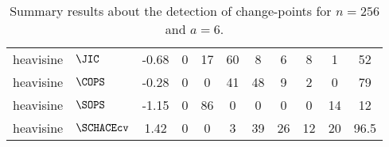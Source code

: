\begin{table}[ht]
\begin{tabular}{llccccccccc}
  heavisine & $\JIC$ & -0.68 &     0 &    17 &    60 &     8 &     6 &     8 &     1 &    52 \\ 
  heavisine & $\COPS$ & -0.28 &     0 &     0 &    41 &    48 &     9 &     2 &     0 &    79 \\ 
  heavisine & $\SOPS$ & -1.15 &     0 &    86 &     0 &     0 &     0 &     0 &    14 &    12 \\ 
  heavisine & $\SCHACEcv$ &  1.42 &     0 &     0 &     3 &    39 &    26 &    12 &    20 &  96.5 \\ 
  \end{tabular}
\caption{Summary results about the detection of change-points for $n = 256$ and $a = 6$.} 
\label{tab:CPn256a6}
\end{table}
